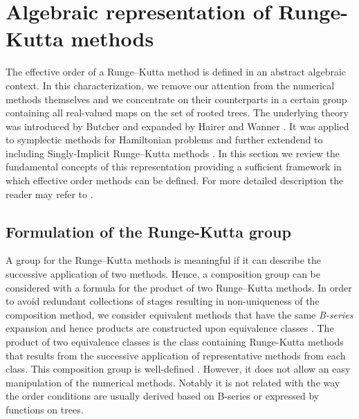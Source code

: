 \section{Algebraic representation of Runge-Kutta methods}\label{sec:Algebraic_RK}


The effective order of a Runge--Kutta method is defined in an abstract algebraic context. In this characterization, we remove our attention from the numerical methods themselves and we concentrate on their counterparts in a certain group containing all real-valued maps on the set of rooted trees. The underlying theory was introduced by Butcher \cite{Butcher1969} and expanded by Hairer and Wanner \cite{Hairer1974}.
It was applied to symplectic methods for Hamiltonian problems \cite{Lopez1996} and further extendend to including Singly-Implicit Runge--Kutta methods \cite{Butcher1997, Butcher1999}. In this section we review the fundamental concepts of this representation providing a sufficient framework in which effective order methods can be defined. For more detailed description the reader may refer to \cite{Butcher2008_book, Butcher1972}.

\subsection{Formulation of the Runge-Kutta group}\label{sec:RK_group}

A group for the Runge--Kutta methods is meaningful if it can describe the successive application of two methods.
Hence, a composition group can be considered with a formula for the product of two Runge--Kutta methods.
In order to avoid redundant collections of stages resulting in non-uniqueness of the composition method, we consider equivalent methods that have the same \emph{B-series} expansion and hence products are constructed upon equivalence classes \cite{Butcher1987_book, Butcher2008_book}. The product of two equivalence classes is the class containing Runge-Kutta methods that results from the successive application of representative methods from each class.
This composition group is well-defined \cite{Butcher1972}.
However, it does not allow an easy manipulation of the numerical methods.
Notably it is not related with the way the order conditions are usually derived based on B-series or expressed by functions on trees.

